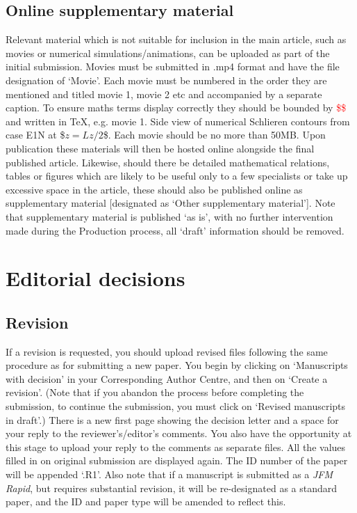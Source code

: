 \documentclass[lineno]{jfm}
\begin{document}
\subsection{Online supplementary material}\label{online}
 Relevant material which is not suitable for inclusion in the main article, such as movies or numerical simulations/animations, can be uploaded as part of the initial submission. Movies must be submitted in .mp4 format and have the file designation of `Movie'.  Each movie must be numbered in the order they are mentioned and titled movie 1, movie 2 etc and accompanied by a separate caption. To ensure maths terms display correctly they should be bounded by \textcolor{red}{ \$\$} and written in TeX, e.g. movie 1. Side view of numerical Schlieren contours from case E1N at {\$$z=Lz/2$\$}. Each movie should be no more than 50MB. Upon publication these materials will then be hosted online alongside the final published article. Likewise, should there be detailed mathematical relations, tables or figures which are likely to be useful only to a few specialists or take up excessive space in the article, these should also be published online as supplementary material [designated as `Other supplementary material']. Note that supplementary material is published `as is', with no further intervention made during the Production process, all `draft' information should be removed.

\section{Editorial decisions}
\subsection{Revision}
 If a revision is requested, you should upload revised files following the same procedure as for submitting a new paper. You begin by clicking on `Manuscripts with decision' in your Corresponding Author Centre, and then on `Create a revision'. (Note that if you abandon the process before completing the submission, to continue the submission, you must click on `Revised manuscripts in draft'.) There is a new first page showing the decision letter and a space for your reply to the reviewer's/editor's comments. You also have the opportunity at this stage to upload your reply to the comments as  separate files. All the values filled in on original submission are displayed again. The ID number of the paper will be appended `.R1'. Also note that if a manuscript is submitted as a {\it JFM Rapid}, but requires substantial revision, it will be re-designated as a standard paper, and the ID and paper type will be amended to reflect this.
\end{document}
